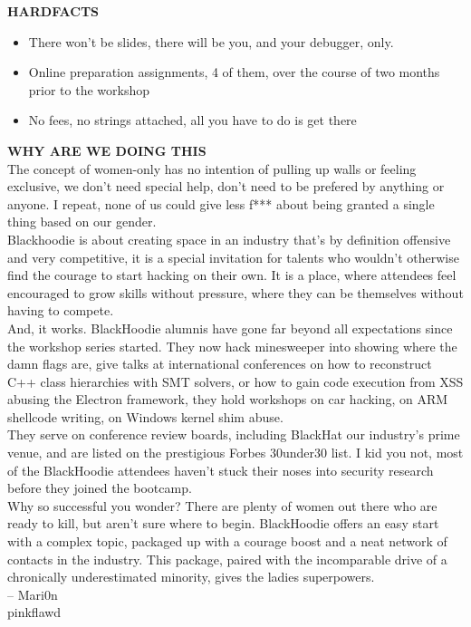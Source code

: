 \textbf{HARDFACTS}
\begin{itemize}
	\item There won’t be slides, there will be you, and your debugger, only.
	\item Online preparation assignments, 4 of them, over the course of two months prior to the workshop
	\item No fees, no strings attached, all you have to do is get there
\end{itemize}

\textbf{WHY ARE WE DOING THIS}\\

The concept of women-only has no intention of pulling up walls or feeling exclusive, we don’t need special help, don’t need to be prefered by anything or anyone. I repeat, none of us could give less f*** about being granted a single thing based on our gender.\\

Blackhoodie is about creating space in an industry that’s by definition offensive and very competitive, it is a special invitation for talents who wouldn’t otherwise find the courage to start hacking on their own. It is a place, where attendees feel encouraged to grow skills without pressure, where they can be themselves without having to compete.\\

And, it works. BlackHoodie alumnis have gone far beyond all expectations since the workshop series started. They now hack minesweeper into showing where the damn flags are, give talks at international conferences on how to reconstruct C++ class hierarchies with SMT solvers, or how to gain code execution from XSS abusing the Electron framework, they hold workshops on car hacking, on ARM shellcode writing, on Windows kernel shim abuse.\\

They serve on conference review boards, including BlackHat our industry’s prime venue, and are listed on the prestigious Forbes 30under30 list. I kid you not, most of the BlackHoodie attendees haven’t stuck their noses into security research before they joined the bootcamp.\\

Why so successful you wonder? There are plenty of women out there who are ready to kill, but aren’t sure where to begin. BlackHoodie offers an easy start with a complex topic, packaged up with a courage boost and a neat network of contacts in the industry. This package, paired with the incomparable drive of a chronically underestimated minority, gives the ladies superpowers.\\

– Mari0n \\
\faTwitter \hspace{0.05cm} pinkflawd
